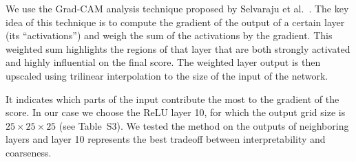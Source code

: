 \documentclass{bioinfo}
\begin{document}
We use the Grad-CAM analysis technique proposed by Selvaraju et
al.~\citep{selvaraju2016grad}. The key idea of this technique is to
compute the gradient of the output of a certain layer (its
``activations'') and weigh the sum of the activations by the gradient.
This weighted sum highlights the regions of that layer that are both
strongly activated and highly influential on the final score.  The
weighted layer output is then upscaled using trilinear interpolation to 
the size of the input of the network.

It indicates which parts of the input contribute the most to the
gradient of the score.  In our case we choose the ReLU layer 10, for
which the output grid size is $25\times 25\times 25$ (see Table~S3).  We
tested the method on the outputs of neighboring layers and layer 10
represents the best tradeoff between interpretability and coarseness.
\end{document}
